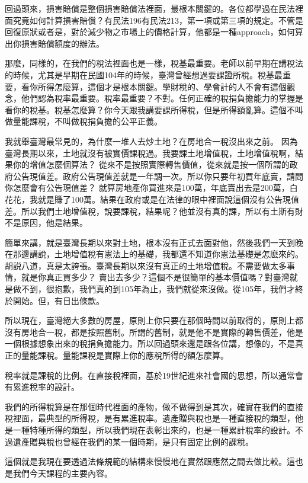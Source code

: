 \documentclass[]{ctexbook}
\begin{document}
回過頭來，損害賠償是整個損害賠償法裡面，最根本關鍵的。各位都學過在民法裡面究竟如何計算損害賠償？有民法196有民法213，第一項或第三項的規定。不管是回復原狀或者是，對於減少物之市場上的價格計算，他都是一種approach，如何算出你損害賠償額度的辦法。

那麼，同樣的，在我們的稅法裡面也是一樣，稅基最重要。老師以前早期在講稅法的時候，尤其是早期在民國104年的時候，臺灣曾經想過要課證所稅。稅基最重要，看你所得怎麼算，這個才是根本關鍵。學財稅的、學會計的人不會有這個觀念，他們認為稅率最重要。稅率最重要？不對。任何正確的稅捐負擔能力的掌握是看你的稅基。稅基怎麼算？你今天跟我講要課所得稅，但是所得額亂算。這個不叫做量能課稅，不叫做稅捐負擔的公平正義。

我就舉臺灣最常見的，為什麼一堆人去炒土地？在房地合一稅沒出來之前。 因為臺灣長期以來，土地就沒有被實價課稅過。我要課土地增值稅，土地增值稅啊，結果你的增值怎麼個算法？ 從來不是按照實際轉售價值，從來就是按一個所謂的政府公告現值差。政府公告現值差就是一年調一次。所以你只要年初買年底賣，請問你怎麼會有公告現值差？ 就算房地產你買進來是100萬，年底賣出去是200萬，白花花，我就是賺了100萬。結果在政府或是在法律的眼中裡面說這個沒有公告現值差。所以我們土地增值稅，說要課稅，結果呢？他並沒有真的課，所以有土斯有財不是原因，他是結果。

簡單來講，就是臺灣長期以來對土地，根本沒有正式去面對他，然後我們一天到晚在那邊講說，土地增值稅有憲法上的基礎，我都還不知道你憲法基礎是怎麽來的。胡説八道，真是太誇張。臺灣長期以來沒有真正的土地增值稅。不需要做太多事情，就是你真正買多少？ 賣出去多少？這個不是很簡單的基本價值嗎？對臺灣就是做不到，很抱歉，我們真的到105年為止，我們就從來沒做。從105年，我們才終於開始。但，有日出條款。

所以現在，臺灣絕大多數的房屋，原則上你只要在那個時間以前取得的，原則上都沒有房地合一稅，都是按照舊制。所謂的舊制，就是他不是實際的轉售價差，他是一個根據想象出來的稅捐負擔能力。所以回過頭來還是跟各位講，想像的，不是真正的量能課稅。量能課稅是實際上你的應稅所得的額怎麼算。

稅率就是課稅的比例。在直接稅裡面，基於19世紀進來社會國的思想，所以通常會有累進稅率的設計。

我們的所得稅算是在那個時代裡面的產物，做不做得到是其次，確實在我們的直接稅裡面，最典型的所得稅，是有累進稅率。遺產贈與稅也是一種直接稅的類型，他是一種特種所得的類型，所以我們現在表彰出來的，也是一種累計稅率的設計。不過遺產贈與稅也曾經在我們的某一個時期，是只有固定比例的課稅。

這個就是我現在要透過法條規範的結構來慢慢地在實然跟應然之間去做比較。這也是我們今天課程的主要內容。
\end{document}
